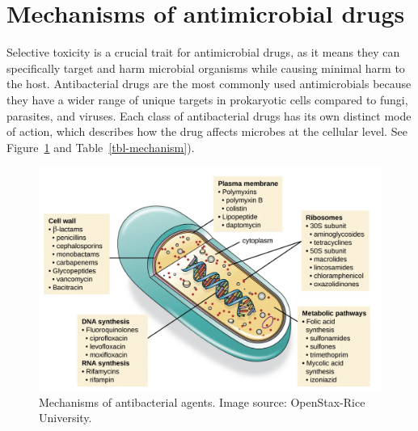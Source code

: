 \documentclass[
  letterpaper,
  DIV=11,
  numbers=noendperiod]{scrreprt}
\begin{document}
\hypertarget{mechanisms-of-antimicrobial-drugs}{%
\section{Mechanisms of antimicrobial
drugs}\label{mechanisms-of-antimicrobial-drugs}}

Selective toxicity is a crucial trait for antimicrobial drugs, as it
means they can specifically target and harm microbial organisms while
causing minimal harm to the host. Antibacterial drugs are the most
commonly used antimicrobials because they have a wider range of unique
targets in prokaryotic cells compared to fungi, parasites, and viruses.
Each class of antibacterial drugs has its own distinct mode of action,
which describes how the drug affects microbes at the cellular level. See
Figure~\ref{fig-bactmechanism} and Table~\ref{tbl-mechanism}).

\begin{figure}

{\centering 

\includegraphics{images/bactmechanism.png}

}

\caption{\label{fig-bactmechanism}Mechanisms of antibacterial agents.
Image source: OpenStax-Rice University.}

\end{figure}
\end{document}
